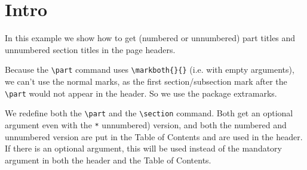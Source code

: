 \documentclass{article}
\begin{document}
\tableofcontents

\part*{Intro}

\noindent
\begin{boxedminipage}{\textwidth}
In this example we show how to get (numbered or unnumbered) part titles and unnumbered section titles in the page headers.

Because the \verb|\part| command uses \verb|\markboth{}{}| (i.e. with empty arguments), we can't use the normal marks, as the first section/subsection mark after the \verb|\part| would not appear in the header.
So we use the package extramarks.

We redefine both the \verb|\part| and the \verb|\section| command. Both get an optional argument even with the \texttt{*} unnumbered) version, and both the numbered and unnumbered version are put in the Table of Contents and are used in the header. If there is an optional argument, this will be used instead of the mandatory argument in both the header and the Table of Contents.
\end{boxedminipage}
\end{document}

